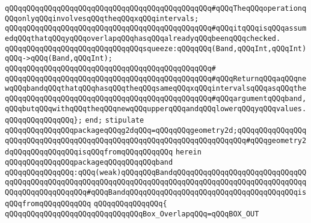 \verb|qQQqqQQqqQQqqQQqqQQqqQQqqQQqqQQqqQQqqQQqqQQqqQQq#qQQqTheqQQqoperationqQQqonlyqQQqinvolvesqQQqtheqQQqxqQQqintervals;|\newline
\verb|qQQqqQQqqQQqqQQqqQQqqQQqqQQqqQQqqQQqqQQqqQQqqQQq#qQQqitqQQqisqQQqassumedqQQqthatqQQqyqQQqoverlapqQQqhasqQQqalreadyqQQqbeenqQQqchecked.|\newline
\newline
\newline
\newline
\verb|qQQqqQQqqQQqqQQqqQQqqQQqqQQqqQQqsqueeze:qQQqqQQq(Band,qQQqInt,qQQqInt)qQQq->qQQq(Band,qQQqInt);|\newline
\verb|qQQqqQQqqQQqqQQqqQQqqQQqqQQqqQQqqQQqqQQqqQQqqQQq#|\newline
\verb|qQQqqQQqqQQqqQQqqQQqqQQqqQQqqQQqqQQqqQQqqQQqqQQq#qQQqReturnqQQqaqQQqnewqQQqbandqQQqthatqQQqhasqQQqtheqQQqsameqQQqxqQQqintervalsqQQqasqQQqthe|\newline
\verb|qQQqqQQqqQQqqQQqqQQqqQQqqQQqqQQqqQQqqQQqqQQqqQQq#qQQqargumentqQQqband,qQQqbutqQQqwithqQQqtheqQQqnewqQQqupperqQQqandqQQqlowerqQQqyqQQqvalues.|\newline
\newline
\verb|qQQqqQQqqQQqqQQq};|\newline
\verb|end;|\newline
\newline
\newline
\newline
\verb|stipulate|\newline
\verb|qQQqqQQqqQQqqQQqpackageqQQqg2dqQQq=qQQqqQQqgeometry2d;qQQqqQQqqQQqqQQqqQQqqQQqqQQqqQQqqQQqqQQqqQQqqQQqqQQqqQQqqQQqqQQqqQQqqQQq#qQQqgeometry2dqQQqqQQqqQQqqQQqisqQQqfromqQQqqQQqqQQq|\newline
\verb|herein|\newline
\newline
\verb|qQQqqQQqqQQqqQQqpackageqQQqqQQqqQQqband|\newline
\verb|qQQqqQQqqQQqqQQq:qQQq(weak)qQQqqQQqBandqQQqqQQqqQQqqQQqqQQqqQQqqQQqqQQqqQQqqQQqqQQqqQQqqQQqqQQqqQQqqQQqqQQqqQQqqQQqqQQqqQQqqQQqqQQqqQQqqQQqqQQqqQQqqQQqqQQqqQQq#qQQqBandqQQqqQQqqQQqqQQqqQQqqQQqqQQqqQQqqQQqqQQqisqQQqfromqQQqqQQqqQQq|\newline
\verb|qQQqqQQqqQQqqQQq{|\newline
\newline
\verb|qQQqqQQqqQQqqQQqqQQqqQQqqQQqqQQqBox_OverlapqQQq=qQQqBOX_OUT|\newline
